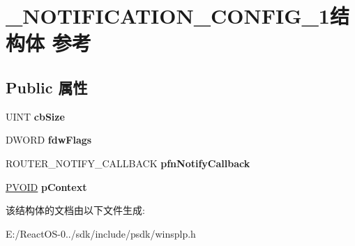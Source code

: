 \hypertarget{struct___n_o_t_i_f_i_c_a_t_i_o_n___c_o_n_f_i_g__1}{}\section{\+\_\+\+N\+O\+T\+I\+F\+I\+C\+A\+T\+I\+O\+N\+\_\+\+C\+O\+N\+F\+I\+G\+\_\+1结构体 参考}
\label{struct___n_o_t_i_f_i_c_a_t_i_o_n___c_o_n_f_i_g__1}
\subsection*{Public 属性}
\begin{DoxyCompactItemize}
\item 
\mbox{\label{struct___n_o_t_i_f_i_c_a_t_i_o_n___c_o_n_f_i_g__1_ae145daa50fff0692e9f0385aa3f1af17}} 
U\+I\+NT {\bfseries cb\+Size}
\item 
\mbox{\label{struct___n_o_t_i_f_i_c_a_t_i_o_n___c_o_n_f_i_g__1_a6a510d9cb610cdbd7cdea5e611a0f247}} 
D\+W\+O\+RD {\bfseries fdw\+Flags}
\item 
\mbox{\label{struct___n_o_t_i_f_i_c_a_t_i_o_n___c_o_n_f_i_g__1_a92b15de82d2924a01e68329ada60f9a6}} 
R\+O\+U\+T\+E\+R\+\_\+\+N\+O\+T\+I\+F\+Y\+\_\+\+C\+A\+L\+L\+B\+A\+CK {\bfseries pfn\+Notify\+Callback}
\item 
\mbox{\label{struct___n_o_t_i_f_i_c_a_t_i_o_n___c_o_n_f_i_g__1_aefe3c37ca0f38c25f294dad91c11d63f}} 
\hyperlink{interfacevoid}{P\+V\+O\+ID} {\bfseries p\+Context}
\end{DoxyCompactItemize}


该结构体的文档由以下文件生成\+:\begin{DoxyCompactItemize}
\item 
E\+:/\+React\+O\+S-\/0../sdk/include/psdk/winsplp.\+h\end{DoxyCompactItemize}
